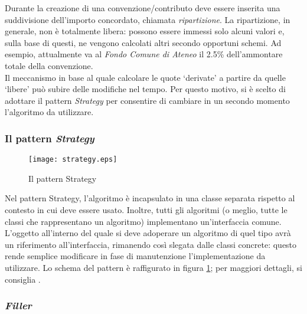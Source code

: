 Durante la creazione di una convenzione/contributo deve essere inserita una suddivisione dell'importo concordato, chiamata \textsl{ripartizione}. La ripartizione, in generale, non è totalmente libera: possono essere immessi solo alcuni valori e, sulla base di questi, ne vengono calcolati altri secondo opportuni schemi. Ad esempio, attualmente va al \textsl{Fondo Comune di Ateneo} il 2.5\% dell'ammontare totale della convenzione. \\
Il meccanismo in base al quale calcolare le quote \textquoteleft derivate\textquoteright{} a partire da quelle \textquoteleft libere\textquoteright{} può subire delle modifiche nel tempo. Per questo motivo, si è scelto di adottare il pattern \textsl{Strategy} per consentire di cambiare in un secondo momento l'algoritmo da utilizzare.\\

\subsubsection{Il pattern \textsl{Strategy}}

\begin{figure}[h]
\centering
\texttt{[image: strategy.eps]}
\caption{Il pattern Strategy}
\label{strategy}
\end{figure}


Nel pattern Strategy, l'algoritmo è incapsulato in una classe separata rispetto al contesto in cui deve essere usato. Inoltre, tutti gli algoritmi (o meglio, tutte le classi che rappresentano un algoritmo) implementano un'interfaccia comune. L'oggetto all'interno del quale si deve adoperare un algoritmo di quel tipo avrà un riferimento all'interfaccia, rimanendo così slegata dalle classi concrete: questo rende semplice modificare in fase di manutenzione l'implementazione da utilizzare. Lo schema del pattern è raffigurato in figura \ref{strategy}; per maggiori dettagli, si consiglia \cite{gof}.\\

\subsubsection{\textsl{Filler}}

